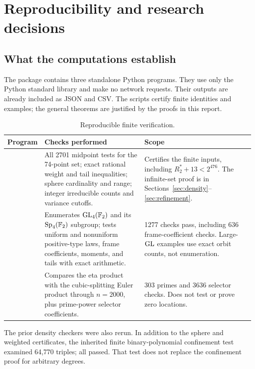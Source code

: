 \section{Reproducibility and research decisions}\label{sec:verification}

\subsection{What the computations establish}

The package contains three standalone Python programs. They use only
the Python standard library and make no network requests. Their outputs
are already included as JSON and CSV. The scripts certify finite
identities and examples; the general theorems are justified by the
proofs in this report.

\begin{table}[htbp]
\centering\small
\begin{tabularx}{\textwidth}{@{}p{}YY@{}}
\toprule
Program & Checks performed & Scope\\
\midrule
{} &
All 2701 midpoint tests for the 74-point set; exact rational weight and
tail inequalities; sphere cardinality and range; integer irreducible
counts and variance cutoffs. &
Certifies the finite inputs, including \(R_2^*+13<2^{476}\).
The infinite-set proof is in Sections~\ref{sec:density}--\ref{sec:refinement}.\\
\addlinespace
{} &
Enumerates \(\operatorname{GL}_4(\mathbb F_2)\) and its \(\operatorname{Sp}_4(\mathbb F_2)\) subgroup;
tests uniform and nonuniform positive-type laws, frame coefficients,
moments, and tails with exact arithmetic. &
1277 checks pass, including 636 frame-coefficient checks.
Large-\(\operatorname{GL}\) examples use exact orbit counts, not enumeration.\\
\addlinespace
{} &
Compares the eta product with the cubic-splitting Euler product
through \(n=2000\), plus prime-power selector coefficients. &
303 primes and 3636 selector checks. Does not test or prove zero
locations.\\
\bottomrule
\end{tabularx}
\caption{Reproducible finite verification.}
\end{table}

The prior density checkers were also rerun. In addition to the sphere
and weighted certificates, the inherited finite binary-polynomial
confinement test examined 64,770 triples; all passed. That test does not
replace the confinement proof for arbitrary degrees.

